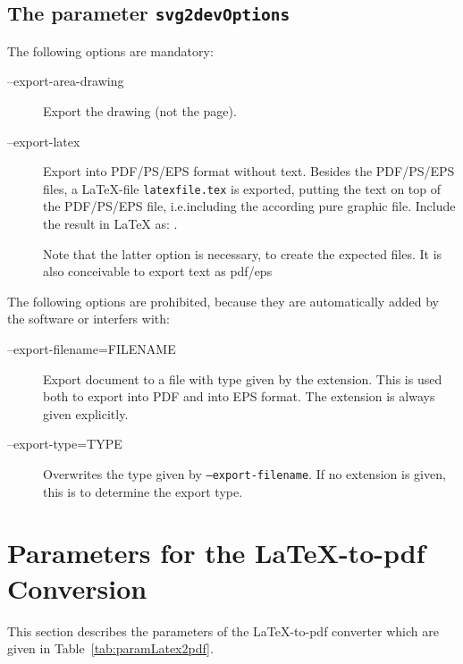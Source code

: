 

\subsection{The parameter \texttt{svg2devOptions}}%
\label{subsec:svg2devOptions}

The following options are mandatory: 
%
\begin{description}
\item[--export-area-drawing] 
Export the drawing (not the page). 
\item[--export-latex] 
Export into PDF/PS/EPS format without text. 
Besides the PDF/PS/EPS files, a \LaTeX-file \texttt{latexfile.tex} is exported,
putting the text on top of the PDF/PS/EPS file, 
i.e.\@ including the according pure graphic file. 
Include the result in \LaTeX{} as: . 

Note that the latter option is necessary, 
to create the expected files. 
It is also conceivable to export text as pdf/eps 
\end{description}

\noindent
The following options are prohibited, 
because they are automatically added by the software or interfers with: 
%
\begin{description}
\item[--export-filename=FILENAME] Export document to a file with type given by the extension. 
This is used both to export into PDF and into EPS format. 
The extension is always given explicitly. 
\item[--export-type=TYPE] Overwrites the type given by \texttt{--export-filename}. 
If no extension is given, this is to determine the export type. 
\end{description}


\section{Parameters for the \LaTeX-to-pdf Conversion}%
\label{sec:settingsLatex2pdf}

This section describes the parameters 
of the \LaTeX-to-pdf converter 
which are given in Table~\ref{tab:paramLatex2pdf}. 

